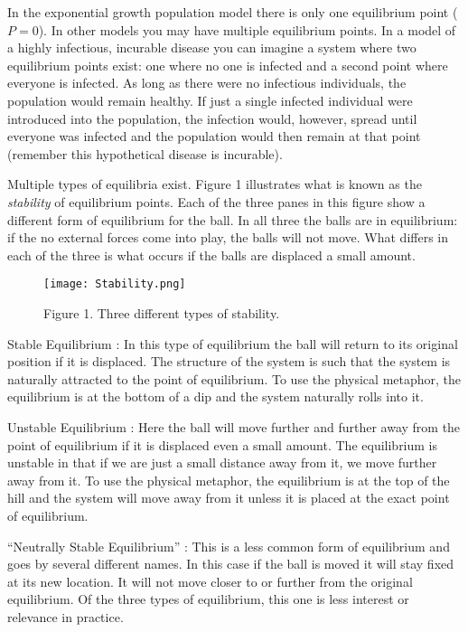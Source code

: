 \documentclass[]{memoir}
\makeatletter
\def\maxwidth{\ifdim\Gin@nat@width>\linewidth\linewidth
\else\Gin@nat@width\fi}
\let\Oldincludegraphics\includegraphics
\renewcommand{\includegraphics}[1]{\Oldincludegraphics[width=\maxwidth]{#1}}
\makeatother
\begin{document}
In the exponential growth population model there is only one equilibrium
point ($P=0$). In other models you may have multiple equilibrium points.
In a model of a highly infectious, incurable disease you can imagine a
system where two equilibrium points exist: one where no one is infected
and a second point where everyone is infected. As long as there were no
infectious individuals, the population would remain healthy. If just a
single infected individual were introduced into the population, the
infection would, however, spread until everyone was infected and the
population would then remain at that point (remember this hypothetical
disease is incurable).

Multiple types of equilibria exist. Figure 1 illustrates what is known
as the \emph{stability} of equilibrium points. Each of the three panes
in this figure show a different form of equilibrium for the ball. In all
three the balls are in equilibrium: if the no external forces come into
play, the balls will not move. What differs in each of the three is what
occurs if the balls are displaced a small amount.

\begin{figure}[htbp]
\centering
\texttt{[image: Stability.png]}
\caption{Figure 1. Three different types of stability.}
\end{figure}

Stable Equilibrium : In this type of equilibrium the ball will return to
its original position if it is displaced. The structure of the system is
such that the system is naturally attracted to the point of equilibrium.
To use the physical metaphor, the equilibrium is at the bottom of a dip
and the system naturally rolls into it.

Unstable Equilibrium : Here the ball will move further and further away
from the point of equilibrium if it is displaced even a small amount.
The equilibrium is unstable in that if we are just a small distance away
from it, we move further away from it. To use the physical metaphor, the
equilibrium is at the top of the hill and the system will move away from
it unless it is placed at the exact point of equilibrium.

``Neutrally Stable Equilibrium'' : This is a less common form of
equilibrium and goes by several different names. In this case if the
ball is moved it will stay fixed at its new location. It will not move
closer to or further from the original equilibrium. Of the three types
of equilibrium, this one is less interest or relevance in practice.
\end{document}

